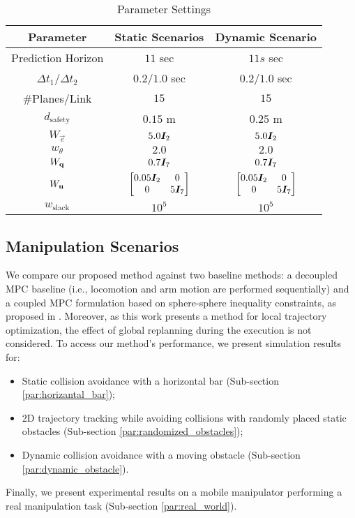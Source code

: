 \begin{table}[h]
  \centering
  \caption{Parameter Settings}
  \label{tab:parameters}
  \begin{tabular}{|c|c|c|}
  \hline
  Parameter & Static Scenarios & Dynamic Scenario\\
  \hline
  Prediction Horizon & $11$ sec & $11s$ sec\\
  \hline
  $\Delta t_1$/$\Delta t_2$ & $0.2$/$1.0$ sec & $0.2$/$1.0$ sec\\
  \hline
  \#Planes/Link & $15$ & $15$ \\
  \hline
  $d_{\textrm{safety}}$ & $0.15$ m & $0.25$ m \\
  \hline
  $W_{\vec{e}}$ & $5.0\bm{I}_2$ & $5.0\bm{I}_2$\\
  \hline
  $w_{\theta}$ & $2.0$ & $2.0$\\
  \hline
  $W_{\mathbf{q}}$ & $0.7 \bm{I}_7$ & $0.7 \bm{I}_7$ \\
  \hline
  $W_{\mathbf{u}}$ & $\begin{bmatrix} 0.05\bm{I}_2 & 0 \\ 0 & 5\bm{I}_7 \end{bmatrix}$ &
  $\begin{bmatrix} 0.05\bm{I}_2 & 0 \\ 0 & 5\bm{I}_7 \end{bmatrix}$ \\
  \hline
  $w_{\textrm{slack}}$ & $10^{5}$ & $10^{5}$\\
  \hline
  \end{tabular}
\end{table}
%
%
\subsection{Manipulation Scenarios}%
\label{sub:environment_setup}

We compare our proposed method against two baseline methods: a decoupled MPC baseline (i.e., locomotion and arm motion are performed sequentially) and a coupled MPC formulation based on sphere-sphere inequality constraints, as proposed in \cite{Avanzini2018}. Moreover, as this work presents a method for local trajectory optimization, the effect of global replanning during the execution is not considered. To access our method's performance, we present simulation results for:
\begin{itemize}
    \item Static collision avoidance with a horizontal bar \cite{Avanzini2018} (Sub-section \ref{par:horizantal_bar});
    \item 2D trajectory tracking while avoiding collisions with randomly placed static obstacles (Sub-section \ref{par:randomized_obstacles});
    \item Dynamic collision avoidance with a moving obstacle (Sub-section \ref{par:dynamic_obstacle}).
\end{itemize} 
Finally, we present experimental results on a mobile manipulator performing a real manipulation task (Sub-section \ref{par:real_world}).

